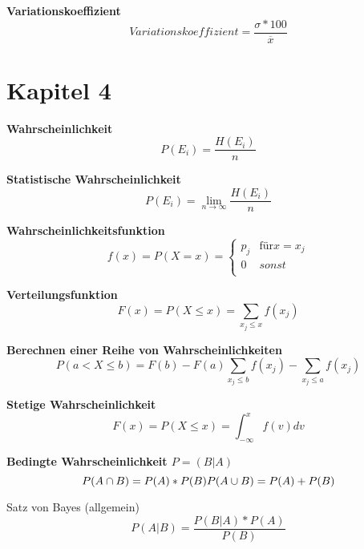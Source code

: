 \documentclass[11pt,twocolumn,fleqn]{article}
\begin{document}
\textbf{Variationskoeffizient}
\begin{equation*}
Variationskoeffizient = \frac{\sigma * 100}{\overline{x} } 
\end{equation*}


\section{Kapitel 4}

\textbf{Wahrscheinlichkeit}
\begin{equation*}
P(E_i)=\frac{H(E_i)}{n}
\end{equation*}

\textbf{Statistische Wahrscheinlichkeit}
\begin{equation*}
P(E_i)= \lim_{n \to \infty} \frac{H(E_i)}{n}
\end{equation*}

\textbf{Wahrscheinlichkeitsfunktion}
\begin{equation*}
f(x)=P(X=x)= \begin{cases} 
p_j & \text{für}  x = x_j \\ 
0 & sonst  \\ 
\end{cases}
\end{equation*}

\textbf{Verteilungsfunktion}
\begin{equation*}
F(x)=P(X \leq x)=\sum_{x_j \leq x }f(x_j)
\end{equation*}

\textbf{Berechnen einer Reihe von Wahrscheinlichkeiten}
\begin{equation*}
P(a<X \leq b) = F(b)-F(a) \sum_{x_j \leq b }f(x_j) - \sum_{x_j \leq a }f(x_j)
\end{equation*}

\textbf{Stetige Wahrscheinlichkeit}
\begin{equation*}
F(x) = P(X \leq x) = \int^x_{-\infty} f(v)dv
\end{equation*}

\textbf{Bedingte Wahrscheinlichkeit $P=(B|A)$}
\begin{equation*}
P(A \cap B) = P(A) * P(B)\\
P(A \cup B) = P(A) + P(B)
\end{equation*}

Satz von Bayes (allgemein)
\begin{equation*}
P(A|B) = \frac{ P(B|A) * P(A) }{ P(B) }
\end{equation*}
\end{document}
